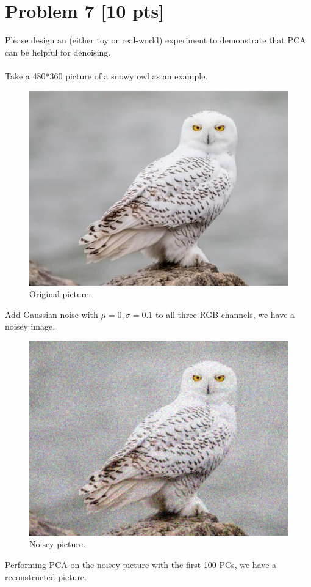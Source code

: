 \documentclass[11pt]{article}
\begin{document}
\section*{Problem 7 [10 pts]}
Please design an (either toy or real-world) experiment  to demonstrate that PCA can be helpful for denoising.\\\\
Take a 480*360 picture of a snowy owl as an example.
\begin{figure}[H] %
	\centering\includegraphics[width=0.6\linewidth]{snowy_owl.jpg}
	\caption{Original picture.} %
	\label{fig:fig6}  %
\end{figure}
Add Gaussian noise with $\mu=0, \sigma=0.1$ to all three RGB channels, we have a noisey image.
\begin{figure}[H] %
	\centering\includegraphics[width=0.6\linewidth]{snowy_owl_noisey.png}
	\caption{Noisey picture.} %
	\label{fig:fig6}  %
\end{figure}
Performing PCA on the noisey picture with the first 100 PCs, we have a reconstructed picture.
\end{document}
